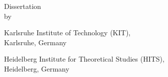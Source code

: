 \begin{titlepage}
\thispagestyle{empty}
\setlength{\unitlength}{1pt}


\newcommand{\tpsb}{\vskip 2.8cm}
\newcommand{\tpss}{\vskip 1.0cm}



\begin{center}
\hbox{}

\tpsb
\tpss
{\huge\bfseries \mytitle \par}
\tpsb
Dissertation\\by\\%
\tpss
{\large\bfseries \myname}


\tpss
Karlsruhe Institute of Technology (KIT),\\
Karlsruhe, Germany

Heidelberg Institute for Theoretical Studies (HITS),\\
Heidelberg, Germany




\end{center}
\end{titlepage}
